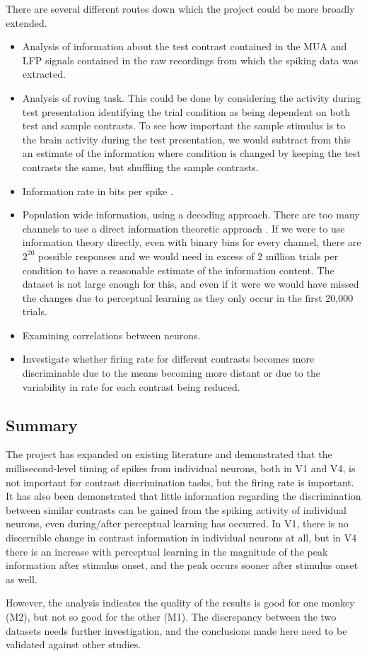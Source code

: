 There are several different routes down which the project could be more broadly extended.

\begin{itemize}
\item Analysis of information about the test contrast contained in the MUA and LFP signals contained in the raw recordings from which the spiking data was extracted.
\item Analysis of roving task. This could be done by considering the activity during test presentation identifying the trial condition as being dependent on both test and sample contrasts. To see how important the sample stimulus is to the brain activity during the test presentation, we would subtract from this an estimate of the information where condition is changed by keeping the test contrasts the same, but shuffling the sample contrasts.
\item Information rate in bits per spike \cite{Rolls2011}.
\item Population wide information, using a decoding approach. There are too many channels to use a direct information theoretic approach \cite{Quiroga2009}.
If we were to use information theory directly, even with binary bins for every channel, there are $2^20$ possible responses and we would need in excess of 2 million trials per condition to have a reasonable estimate of the information content. The dataset is not large enough for this, and even if it were we would have missed the changes due to perceptual learning as they only occur in the first 20,000 trials.
\item Examining correlations between neurons.
\item Investigate whether firing rate for different contrasts becomes more discriminable due to the means becoming more distant or due to the variability in rate for each contrast being reduced.
\end{itemize}

% 
\subsection{Summary}

The project has expanded on existing literature and demonstrated that the millisecond-level timing of spikes from individual neurons, both in V1 and V4, is not important for contrast discrimination tasks, but the firing rate is important. It has also been demonstrated that little information regarding the discrimination between similar contrasts can be gained from the spiking activity of individual neurons, even during/after perceptual learning has occurred. In V1, there is no discernible change in contrast information in individual neurons at all, but in V4 there is an increase with perceptual learning in the magnitude of the peak information after stimulus onset, and the peak occurs sooner after stimulus onset as well.

However, the analysis indicates the quality of the results is good for one monkey (M2), but not so good for the other (M1). The discrepancy between the two datasets needs further investigation, and the conclusions made here need to be validated against other studies.
